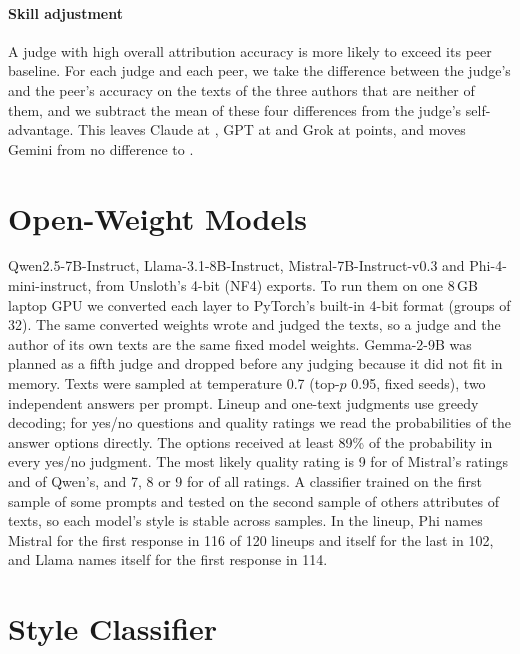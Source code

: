 \paragraph{Skill adjustment} A judge with high overall attribution accuracy
is more likely to exceed its peer baseline. For each judge and each peer, we
take the difference between the judge's and the peer's accuracy on the texts
of the three authors that are neither of them, and we subtract the mean of
these four differences from the judge's self-advantage. This leaves Claude at \ClaudeAdjAdvLineup{}, GPT at \GPTAdjAdvLineup{} and
Grok at \GrokAdjAdvLineup{} points, and moves Gemini from no difference to
\GeminiAdjAdvLineup{}.



\FloatBarrier
\section{Open-Weight Models}
\label{app:openweight}

Qwen2.5-7B-Instruct, Llama-3.1-8B-Instruct, Mistral-7B-Instruct-v0.3 and
Phi-4-mini-instruct, from Unsloth's 4-bit (NF4) exports. To run them on one
8\,GB laptop GPU we converted each layer to PyTorch's built-in 4-bit format
(groups of 32). The same converted weights wrote and judged the texts, so a
judge and the author of its own texts are the same fixed model weights.
Gemma-2-9B was planned as a fifth judge and dropped before any judging
because it did not fit in memory. Texts were sampled at temperature 0.7
(top-$p$ 0.95, fixed seeds), two independent answers per prompt. Lineup and
one-text judgments use greedy decoding; for yes/no questions and quality
ratings we read the probabilities of the answer options directly. The
options received at least 89\% of the probability in every yes/no judgment.
The most likely quality rating is 9 for \CXQualNineMistral{} of Mistral's
ratings and \CXQualNineQwen{} of Qwen's, and 7, 8 or 9 for \CXQualModalTop{}
of all ratings.
A classifier trained on the first sample of some prompts and tested on the
second sample of others attributes \OWClfCrossSample{} of texts, so each
model's style is stable across samples. In the lineup, Phi names Mistral for
the first response in 116 of 120 lineups and itself for the last in 102, and
Llama names itself for the first response in 114.

\FloatBarrier
\section{Style Classifier}
\label{app:classifier}

